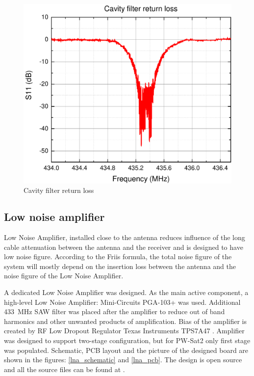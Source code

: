 \begin{figure}
    \centering
    \includegraphics[width=0.5\paperwidth]{img/7/FilterMatchG.pdf}
    \caption{Cavity filter return loss}
    \label{cavity_filter_return_loss}
\end{figure}



\subsection{Low noise amplifier}
Low Noise Amplifier, installed close to the antenna reduces influence of the long cable attenuation between the antenna and the receiver and is designed to have low noise figure. According to the Friis formula, the total noise figure of the system will mostly depend on the insertion loss between the antenna and the noise figure of the Low Noise Amplifier. 

A dedicated Low Noise Amplifier was designed. As the main active component, a high-level Low Noise Amplifier: Mini-Circuits PGA-103+ \cite{lna_pga_datasheet} was used. Additional \SI{433}{\MHz} SAW filter was placed after the amplifier to reduce out of band harmonics and other unwanted products of amplification. Bias of the amplifier is created by RF Low Dropout Regulator Texas Instruments TPS7A47 \cite{lna_ldo_datasheet}. Amplifier was designed to support two-stage configuration, but for PW-Sat2 only first stage was populated. Schematic, PCB layout and the picture of the designed board are shown in the figures: \ref{lna_schematic} and \ref{lna_pcb}. The design is open source and all the source files can be found at \cite{lna_github}.

